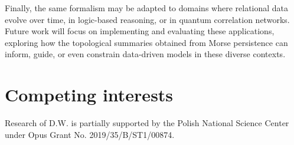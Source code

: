 \documentclass{article}
\theoremstyle{definition}
\theoremstyle{plain}
\theoremstyle{remark}
\newcommand{\1}{\mathbbm{1}}  %
\begin{document}
Finally, the same formalism may be adapted to domains where relational
data evolve over time, in logic-based reasoning, or in quantum
correlation networks.  Future work will focus on implementing and
evaluating these applications, exploring how the topological summaries
obtained from Morse persistence can inform, guide, or even constrain
data-driven models in these diverse contexts.
\section*{Competing interests}
   Research of D.W. is partially supported by the Polish National Science Center under Opus Grant No. 2019/35/B/ST1/00874.\\
    
\newpage


\end{document}
